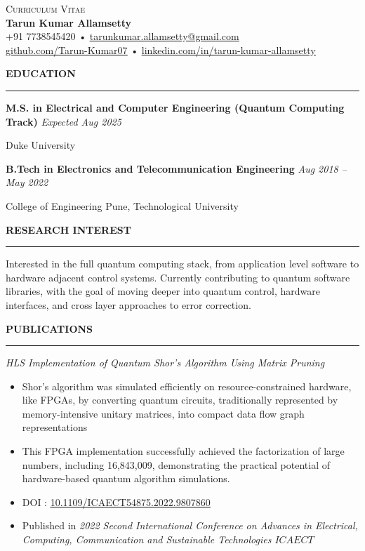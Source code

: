 \documentclass[a4paper,10pt]{article}
\let\oldhref\href
\renewcommand{\href}[2]{\oldhref{#1}{\uline{#2}}}
\newcommand{\cvHeaderOne}[1]{%
  \vspace*{1.5em}%
  {\noindent\large\textbf{\MakeUppercase{#1}}\par}%
  \noindent\rule{\linewidth}{0.4pt}%
  \vspace*{0.5em}%
}
\newcommand{\cvHeaderTwo}[2]{%
  \vspace{0.8em}%
  \noindent\textbf{\normalsize #1} \hfill \textit{#2}\par%
}
\newcommand{\cvHeaderThree}[1]{%
  \noindent\textit{#1}%
}
\newcommand{\cvItem}[1]{%
  \noindent\parbox{\dimexpr\linewidth}{#1}\par%
}
\newenvironment{cvItemList}{%
  \begin{itemize}%
    \setlength{\itemsep}{0.1em}%
    \setlength{\topsep}{0em}%
    \setlength{\partopsep}{0em}%
    \setlength{\parsep}{0em}%
    \setlength{\parskip}{0em}%
}{%
  \end{itemize}%
}
\begin{document}
\begin{center}
  {\large \textsc{Curriculum Vitae}} \\[0.3em]
  {\LARGE \textbf{Tarun Kumar Allamsetty}} \\[0.75em]
  \small
  +91 7738545420 \quad • \quad \href{mailto:tarunkumar.allamsetty@gmail.com}{tarunkumar.allamsetty@gmail.com} \\[0.2em]
  \href{https://github.com/Tarun-Kumar07}{github.com/Tarun-Kumar07} \quad • \quad
  \href{https://www.linkedin.com/in/tarun-kumar-allamsetty}{linkedin.com/in/tarun-kumar-allamsetty}
\end{center}

\vspace{2em}

\cvHeaderOne{Education}

\cvHeaderTwo{M.S. in Electrical and Computer Engineering (Quantum Computing Track)}{Expected Aug 2025}
\cvItem{Duke University}

\cvHeaderTwo{B.Tech in Electronics and Telecommunication Engineering}{Aug 2018 -- May 2022}
\cvItem{College of Engineering Pune, Technological University}


\cvHeaderOne{Research interest}
Interested in the full quantum computing stack, from application level software to hardware adjacent control systems. Currently contributing to quantum software libraries, with the goal of moving deeper into quantum control, hardware interfaces, and cross layer approaches to error correction.

\cvHeaderOne{Publications}

\cvHeaderThree{HLS Implementation of Quantum Shor’s Algorithm Using Matrix Pruning}
\begin{cvItemList}
\item Shor's algorithm was simulated efficiently on resource-constrained hardware, like FPGAs, by converting quantum circuits, traditionally represented by memory-intensive unitary matrices, into compact data flow graph representations
\item This FPGA implementation successfully achieved the factorization of large numbers, including 16,843,009, demonstrating the practical potential of hardware-based quantum algorithm simulations.
\item DOI : \href{https://doi.org/10.1109/ICAECT54875.2022.9807860}{10.1109/ICAECT54875.2022.9807860}
\item Published in \textit{2022 Second International Conference on Advances in Electrical, Computing, Communication and Sustainable Technologies \(ICAECT\)}
\end{cvItemList}
\end{document}
